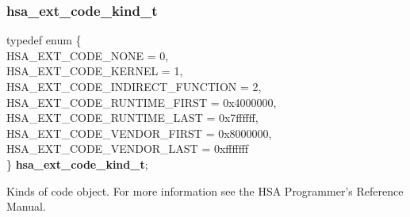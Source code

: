 \documentclass[final,oneside]{book}
\newcommand{\reftyp}[1]{#1}
\newcommand{\refenu}[1]{\reftyp{#1}}
\newenvironment{mylongtable}{\rowcolors{0}{lightgray}{lightgray}\longtable} {
\endlongtable}
\begin{document}
\subsubsection{hsa_\-ext_\-code_\-kind_\-t}
\vspace{-5.5mm}\begin{mylongtable}{@{}p{\textwidth}}
\rule{0pt}{3ex}typedef enum \{\\\hspace{1.7em}\hypertarget{group__ext-finalizer_1gga3a26aac857ef4f02699a2ed8a4c425e3aa692c691cdb10a56486a1e8d246414e3}{\refenu{HSA_\-EXT_\-CODE_\-NONE}} = 0,\\
\hspace{1.7em}\hypertarget{group__ext-finalizer_1gga3a26aac857ef4f02699a2ed8a4c425e3a5c83ef1db7eaa20cdf2612ba26e316cc}{\refenu{HSA_\-EXT_\-CODE_\-KERNEL}} = 1,\\
\hspace{1.7em}\hypertarget{group__ext-finalizer_1gga3a26aac857ef4f02699a2ed8a4c425e3a5f810d8ab0aae6b7f5af079857bbb14c}{\refenu{HSA_\-EXT_\-CODE_\-INDIRECT_\-FUNCTION}} = 2,\\
\hspace{1.7em}\hypertarget{group__ext-finalizer_1gga3a26aac857ef4f02699a2ed8a4c425e3afe329fae97936c684cd1e7df360c7160}{\refenu{HSA_\-EXT_\-CODE_\-RUNTIME_\-FIRST}} = 0x4000000,\\
\hspace{1.7em}\hypertarget{group__ext-finalizer_1gga3a26aac857ef4f02699a2ed8a4c425e3a9c49857996a8d326eabb3080b9e38972}{\refenu{HSA_\-EXT_\-CODE_\-RUNTIME_\-LAST}} = 0x7ffffff,\\
\hspace{1.7em}\hypertarget{group__ext-finalizer_1gga3a26aac857ef4f02699a2ed8a4c425e3aefd6d814296d049b06ab2de301cd10b1}{\refenu{HSA_\-EXT_\-CODE_\-VENDOR_\-FIRST}} = 0x8000000,\\
\hspace{1.7em}\hypertarget{group__ext-finalizer_1gga3a26aac857ef4f02699a2ed8a4c425e3accaced1295912da1748d70c5abde593b}{\refenu{HSA_\-EXT_\-CODE_\-VENDOR_\-LAST}} = 0xfffffff\\
\} \hypertarget{group__ext-finalizer_1ga3a26aac857ef4f02699a2ed8a4c425e3}{\textbf{hsa_\-ext_\-code_\-kind_\-t}};\rule[-2ex]{0pt}{0pt}\end{mylongtable}
\vspace{-5mm}Kinds of code object. For more information see the HSA Programmer's Reference Manual.
\end{document}
